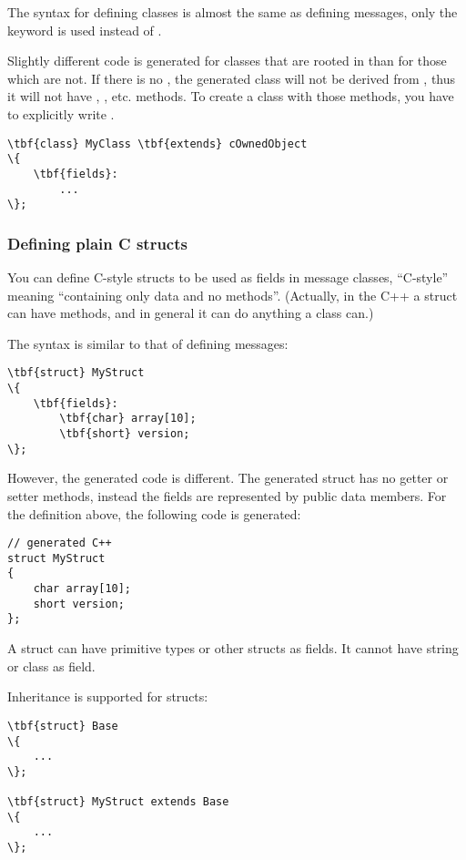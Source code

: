 The syntax for defining classes is almost the same as defining messages,
only the  keyword is used instead of .

Slightly different code is generated for classes that are rooted in
 than for those which are not.
If there is no , the generated class will not be
derived from , thus it will not have ,
, etc. methods.
To create a class with those methods, you have to explicitly write
.

\begin{Verbatim}[commandchars=\\\{\}]
\tbf{class} MyClass \tbf{extends} cOwnedObject
\{
    \tbf{fields}:
        ...
\};
\end{Verbatim}



\subsubsection{Defining plain C structs}

You can define C-style structs to be used as fields in message classes,
``C-style'' meaning ``containing only data and no methods''.
(Actually, in the C++ a struct can have methods,
and in general it can do anything a class can.)

The syntax is similar to that of defining messages:

\begin{Verbatim}[commandchars=\\\{\}]
\tbf{struct} MyStruct
\{
    \tbf{fields}:
        \tbf{char} array[10];
        \tbf{short} version;
\};
\end{Verbatim}

However, the generated code is different. The generated struct has
no getter or setter methods, instead the fields are represented
by public data members. For the definition above, the
following code is generated:

\begin{verbatim}
// generated C++
struct MyStruct
{
    char array[10];
    short version;
};
\end{verbatim}

A struct can have primitive types or other structs as fields. It cannot
have string or class as field.

Inheritance is supported for structs:

\begin{Verbatim}[commandchars=\\\{\}]
\tbf{struct} Base
\{
    ...
\};

\tbf{struct} MyStruct extends Base
\{
    ...
\};
\end{Verbatim}

